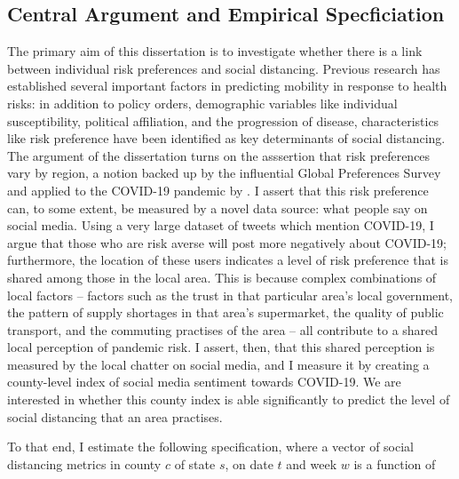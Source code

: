 \documentclass{article}
\begin{document}
\subsection{Central Argument and Empirical Specficiation}
The primary aim of this dissertation is to investigate whether there is a link between individual risk preferences and social distancing. Previous research has established several important factors in predicting mobility in response to health risks: in addition to policy orders, demographic variables like individual susceptibility, political affiliation, and the progression of disease, characteristics like risk preference have been identified as key determinants of social distancing. The argument of the dissertation turns on the asssertion that risk preferences vary by region, a notion backed up by the influential Global Preferences Survey \parencite{falkGlobalEvidenceEconomic2018} and applied to the COVID-19 pandemic by \textcite{fanHeterogeneousActionsBeliefs2020}. I assert that this risk preference can, to some extent, be measured by a novel data source: what people say on social media. Using a very large dataset of tweets which mention COVID-19, I argue that those who are risk averse will post more negatively about COVID-19; furthermore, the location of these users indicates a level of risk preference that is shared among those in the local area. This is because complex combinations of local factors -- factors such as the trust in that particular area's local government, the pattern of supply shortages in that area's supermarket, the quality of public transport, and the commuting practises of the area -- all contribute to a shared local perception of pandemic risk. I assert, then, that this shared perception is measured by the local chatter on social media, and I measure it by creating a county-level index of social media sentiment towards COVID-19. We are interested in whether this county index is able significantly to predict the level of social distancing that an area practises.

To that end, I estimate the following specification, where a vector of social distancing metrics in county \(c\) of state \(s\), on date \(t\) and week \(w\) is a function of
\end{document}
